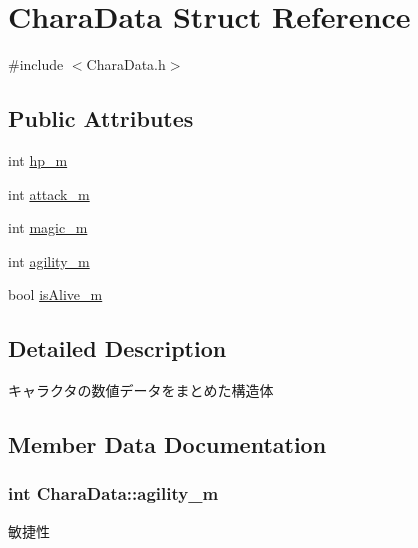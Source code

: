 \hypertarget{struct_chara_data}{}\section{Chara\+Data Struct Reference}
\label{struct_chara_data}


{\ttfamily \#include $<$Chara\+Data.\+h$>$}

\subsection*{Public Attributes}
\begin{DoxyCompactItemize}
\item 
int \hyperlink{struct_chara_data_a7186ee61c28b6a84b0c7a41524ee7d01}{hp\+\_\+m}
\item 
int \hyperlink{struct_chara_data_a329e47c82a4348e2245713aeb51eced5}{attack\+\_\+m}
\item 
int \hyperlink{struct_chara_data_ad76e5c9e2a90755979af927101ec43ac}{magic\+\_\+m}
\item 
int \hyperlink{struct_chara_data_a9105941ccdf5e5cecd7a6eacb78ad9eb}{agility\+\_\+m}
\item 
bool \hyperlink{struct_chara_data_a87b4617204eaa6cb9a683389afb0647e}{is\+Alive\+\_\+m}
\end{DoxyCompactItemize}


\subsection{Detailed Description}
キャラクタの数値データをまとめた構造体 

\subsection{Member Data Documentation}
\hypertarget{struct_chara_data_a9105941ccdf5e5cecd7a6eacb78ad9eb}{}
\subsubsection[{agility\+\_\+m}]{\setlength{\rightskip}{0pt plus 5cm}int Chara\+Data\+::agility\+\_\+m}\label{struct_chara_data_a9105941ccdf5e5cecd7a6eacb78ad9eb}
敏捷性 \hypertarget{struct_chara_data_a329e47c82a4348e2245713aeb51eced5}{}
